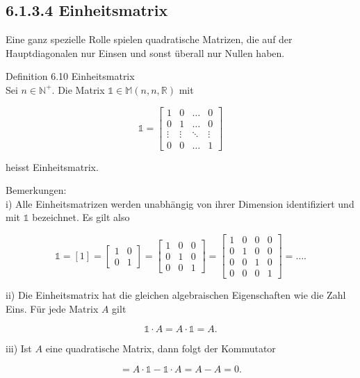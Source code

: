 \documentclass[10pt]{article}
\begin{document}
\subsection*{6.1.3.4 Einheitsmatrix}
Eine ganz spezielle Rolle spielen quadratische Matrizen, die auf der Hauptdiagonalen nur Einsen und sonst überall nur Nullen haben.

Definition 6.10 Einheitsmatrix\\
Sei $n \in \mathbb{N}^{+}$. Die Matrix $\mathbb{1} \in \mathbb{M}(n, n, \mathbb{R})$ mit

\[
\mathbb{1}=\left[\begin{array}{cccc}
1 & 0 & \ldots & 0  \tag{6.20}\\
0 & 1 & \ldots & 0 \\
\vdots & \vdots & \ddots & \vdots \\
0 & 0 & \ldots & 1
\end{array}\right]
\]

heisst Einheitsmatrix.

Bemerkungen:\\
i) Alle Einheitsmatrizen werden unabhängig von ihrer Dimension identifiziert und mit $\mathbb{1}$ bezeichnet. Es gilt also

\[
\mathbb{1}=[1]=\left[\begin{array}{ll}
1 & 0  \tag{6.21}\\
0 & 1
\end{array}\right]=\left[\begin{array}{lll}
1 & 0 & 0 \\
0 & 1 & 0 \\
0 & 0 & 1
\end{array}\right]=\left[\begin{array}{llll}
1 & 0 & 0 & 0 \\
0 & 1 & 0 & 0 \\
0 & 0 & 1 & 0 \\
0 & 0 & 0 & 1
\end{array}\right]=\ldots .
\]

ii) Die Einheitsmatrix hat die gleichen algebraischen Eigenschaften wie die Zahl Eins. Für jede Matrix $A$ gilt


\begin{equation*}
\mathbb{1} \cdot A=A \cdot \mathbb{1}=A . \tag{6.22}
\end{equation*}


iii) Ist $A$ eine quadratische Matrix, dann folgt der Kommutator


\begin{equation*}
[A, \mathbb{1}]=A \cdot \mathbb{1}-\mathbb{1} \cdot A=A-A=0 . \tag{6.23}
\end{equation*}
\end{document}
